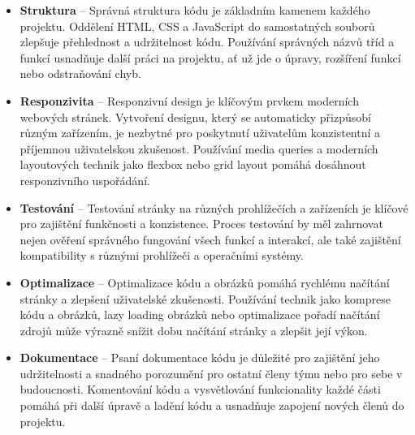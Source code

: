 \begin{itemize}
  \item \textbf{Struktura} -- Správná struktura kódu je základním kamenem každého projektu. Oddělení HTML, CSS a JavaScript do samostatných souborů zlepšuje přehlednost a udržitelnost kódu. Používání správných názvů tříd a funkcí usnadňuje další práci na projektu, ať už jde o úpravy, rozšíření funkcí nebo odstraňování chyb.
  \item \textbf{Responzivita} -- Responzivní design je klíčovým prvkem moderních webových stránek. Vytvoření designu, který se automaticky přizpůsobí různým zařízením, je nezbytné pro poskytnutí uživatelům konzistentní a příjemnou uživatelskou zkušenost. Používání media queries a moderních layoutových technik jako flexbox nebo grid layout pomáhá dosáhnout responzivního uspořádání.
  \item \textbf{Testování} -- Testování stránky na různých prohlížečích a zařízeních je klíčové pro zajištění funkčnosti a konzistence. Proces testování by měl zahrnovat nejen ověření správného fungování všech funkcí a interakcí, ale také zajištění kompatibility s různými prohlížeči a operačními systémy.
  \item \textbf{Optimalizace} -- Optimalizace kódu a obrázků pomáhá rychlému načítání stránky a zlepšení uživatelské zkušenosti. Používání technik jako komprese kódu a obrázků, lazy loading obrázků nebo optimalizace pořadí načítání zdrojů může výrazně snížit dobu načítání stránky a zlepšit její výkon.
  \item \textbf{Dokumentace} --  Psaní dokumentace kódu je důležité pro zajištění jeho udržitelnosti a snadného porozumění pro ostatní členy týmu nebo pro sebe v budoucnosti. Komentování kódu a vysvětlování funkcionality každé části pomáhá při další úpravě a ladění kódu a usnadňuje zapojení nových členů do projektu.
\end{itemize}
